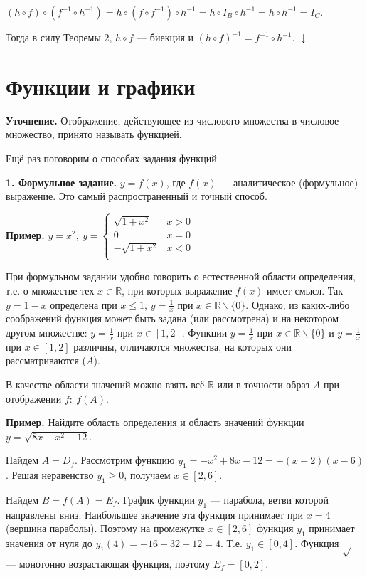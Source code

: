\documentclass{article}
\begin{document}
    $(h \circ f) \circ (f^{-1} \circ h^{-1}) = h \circ (f \circ f^{-1}) \circ h^{-1} = h \circ I_B \circ h^{-1} = h \circ h^{-1} = I_C$.

    Тогда в силу Теоремы $2$, $h \circ f$ --- биекция и $(h \circ f)^{-1} = f^{-1} \circ h^{-1}$. $\downarrow$

    \section{Функции и графики}

    \textbf{Уточнение.} Отображение, действующее из числового множества в числовое множество, принято называть функцией.
    
    Ещё раз поговорим о способах задания функций.

    \textbf{1. Формульное задание.} $y = f(x)$, где $f(x)$ --- аналитическое (формульное) выражение. Это самый распространенный и точный способ.

    \textbf{Пример.} $y = x^2,\ y = \begin{cases}
        \sqrt{1 + x^2} & x > 0\\
        0 & x = 0\\
        -\sqrt{1 + x^2} & x < 0\\
    \end{cases}$

    При формульном задании удобно говорить о естественной области определения, т.е. о множестве тех $x \in \mathbb{R}$, при которых выражение $f(x)$ имеет смысл. Так $y = 1− x$ определена при $x \leq 1$, $y = \frac{1}{x}$ при $x \in \mathbb{R} \backslash \{0\}$. Однако, из каких-либо соображений функция может быть задана (или рассмотрена) и на некотором другом множестве: $y = \frac{1}{x}$ при $x \in [1, 2]$. Функции $y = \frac{1}{x}$ при $x \in \mathbb{R} \backslash \{0\}$ и $y = \frac{1}{x}$ при $x \in [1, 2]$ различны, отличаются множества, на которых они рассматриваются ($A$).

    В качестве области значений можно взять всё $\mathbb{R}$ или в точности образ $A$ при отображении $f:\ f(A)$.

    \textbf{Пример.} Найдите область определения и область значений функции $y = \sqrt{8x - x^2 - 12}$.

    Найдем $A = D_f$. Рассмотрим функцию $y_1 = -x^2 + 8x - 12 = -(x - 2)(x - 6)$. Решая неравенство $y_1 \geq 0$, получаем $x \in [2, 6]$.

    Найдем $B = f(A) = E_f$. График функции $y_1$ --- парабола, ветви которой направлены вниз. Наибольшее значение эта функция принимает при $x = 4$ (вершина параболы). Поэтому на промежутке $x \in [2, 6]$ функция $y_1$ принимает значения от нуля до $y_1(4) = -16 + 32 - 12 = 4$. Т.е. $y_1 \in [0, 4]$. Функция $\sqrt{}$ --- монотонно возрастающая функция, поэтому $E_f = [0, 2]$.
    
\end{document}
